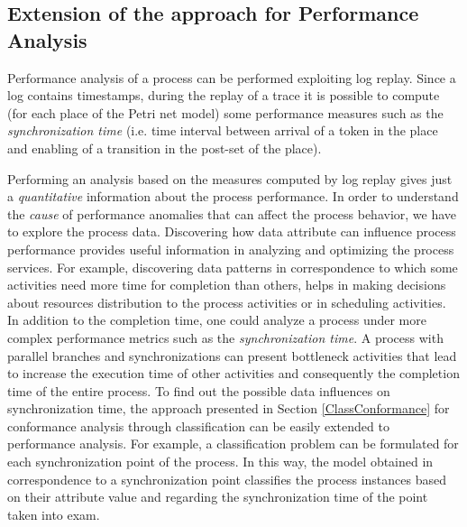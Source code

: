 \documentclass{llncs}
\begin{document}
\subsection{Extension of the approach for Performance Analysis}\label{ClassPerf}

Performance analysis of a process can be performed exploiting log replay. Since a log contains timestamps, during the replay of a trace it is possible to compute (for each place of the Petri net model) some performance measures such as the \emph{synchronization time} (i.e. time interval between arrival of a token in the place and enabling of a transition in the post-set of the place).

Performing an analysis based on the measures computed by log replay gives just a \emph{quantitative} information about the process performance. In order to understand the \emph{cause} of performance anomalies that can affect the process behavior, we have to explore the process data. Discovering how data attribute can influence process performance provides useful information in analyzing and optimizing the process services. For example, discovering data patterns in correspondence to which some activities need more time for completion than others, helps in making decisions about resources distribution to the process activities or in scheduling activities. In addition to the completion time, one could analyze a process under more complex performance metrics such as the \emph{synchronization time}. A process with parallel branches and synchronizations can present bottleneck activities that lead to increase the execution time of other activities and consequently the completion time of the entire process. To find out the possible data influences on synchronization time, the approach presented in Section \ref{ClassConformance} for conformance analysis through classification can be easily extended to performance analysis. For example, a classification problem can be formulated for each synchronization point of the process. In this way, the model obtained in correspondence to a synchronization point classifies the process instances based on their attribute value and regarding the synchronization time of the point taken into exam. 
\end{document}
